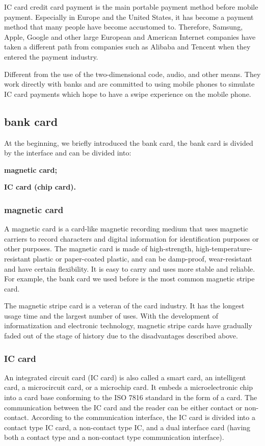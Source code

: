 \documentclass[journal]{IEEEtran}
\begin{document}
IC card credit card payment is the main portable payment method before mobile payment. Especially in Europe and the United States, it has become a payment method that many people have become accustomed to. Therefore, Samsung, Apple, Google and other large European and American Internet companies have taken a different path from companies such as Alibaba and Tencent when they entered the payment industry.

Different from the use of the two-dimensional code, audio, and other means. They work directly with banks and  are committed to using mobile phones to simulate IC card payments which hope to have a swipe experience on the mobile phone.


\subsection{bank card}

At the beginning, we briefly introduced the bank card, the bank card is divided by the interface and can be divided into:

\textbf{magnetic card;}

\textbf{IC card (chip card).}
\subsubsection{magnetic card}
A magnetic card is a card-like magnetic recording medium that uses magnetic carriers to record characters and digital information for identification purposes or other purposes. The magnetic card is made of high-strength, high-temperature-resistant plastic or paper-coated plastic, and can be damp-proof, wear-resistant and have certain flexibility. It is easy to carry and uses more stable and reliable. For example, the bank card we used before is the most common magnetic stripe card.

The magnetic stripe card is a veteran of the card industry. It has the longest usage time and the largest number of uses. With the development of informatization and electronic technology, magnetic stripe cards have gradually faded out of the stage of history due to the disadvantages described above.

\subsubsection{IC card}
An integrated circuit card (IC card) is also called a smart card, an intelligent card, a microcircuit card, or a microchip card. It embeds a microelectronic chip into a card base conforming to the ISO 7816 standard in the form of a card. The communication between the IC card and the reader can be either contact or non-contact. According to the communication interface, the IC card is divided into a contact type IC card, a non-contact type IC, and a dual interface card (having both a contact type and a non-contact type communication interface).
\end{document}

